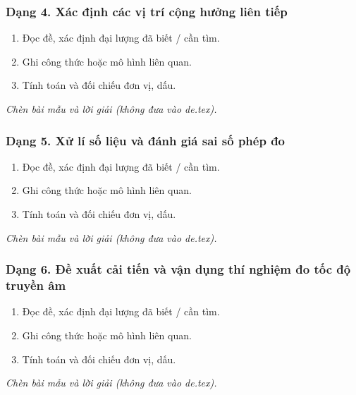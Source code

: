 \subsubsection{Dạng 4. Xác định các vị trí cộng hưởng liên tiếp}
\begin{phuongphap}
\begin{enumerate}
\item Đọc đề, xác định đại lượng đã biết / cần tìm.
\item Ghi công thức hoặc mô hình liên quan.
\item Tính toán và đối chiếu đơn vị, dấu.
\end{enumerate}
\end{phuongphap}
\begin{vidumau}
\textit{Chèn bài mẫu và lời giải (không đưa vào de.tex).}
\end{vidumau}

\subsubsection{Dạng 5. Xử lí số liệu và đánh giá sai số phép đo}
\begin{phuongphap}
\begin{enumerate}
\item Đọc đề, xác định đại lượng đã biết / cần tìm.
\item Ghi công thức hoặc mô hình liên quan.
\item Tính toán và đối chiếu đơn vị, dấu.
\end{enumerate}
\end{phuongphap}
\begin{vidumau}
\textit{Chèn bài mẫu và lời giải (không đưa vào de.tex).}
\end{vidumau}

\subsubsection{Dạng 6. Đề xuất cải tiến và vận dụng thí nghiệm đo tốc độ truyền âm}
\begin{phuongphap}
\begin{enumerate}
\item Đọc đề, xác định đại lượng đã biết / cần tìm.
\item Ghi công thức hoặc mô hình liên quan.
\item Tính toán và đối chiếu đơn vị, dấu.
\end{enumerate}
\end{phuongphap}
\begin{vidumau}
\textit{Chèn bài mẫu và lời giải (không đưa vào de.tex).}
\end{vidumau}

